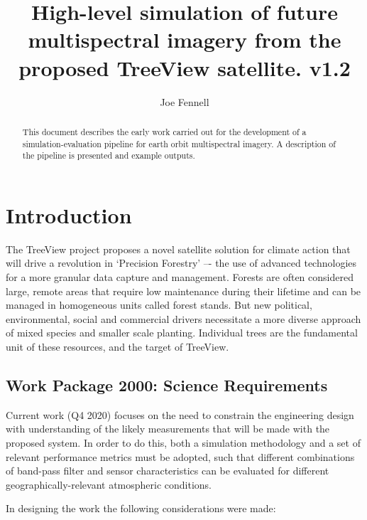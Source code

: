 \documentclass[10pt,a4paper,final,twocolumn]{article}
\author{Joe Fennell}
\title{High-level simulation of future multispectral imagery from the proposed TreeView satellite. v1.2}
\begin{document}
\maketitle
\begin{abstract}
This document describes the early work carried out for the development of a simulation-evaluation pipeline for earth orbit multispectral imagery. A description of the pipeline is presented and example outputs.
\end{abstract}
\section{Introduction}
The TreeView project proposes a novel satellite solution for climate action that will drive a revolution in ‘Precision Forestry’ –- the use of advanced technologies for a more granular data capture and management. Forests are often considered large, remote areas that require low maintenance during their lifetime and can be managed in homogeneous units called forest stands. But new political, environmental, social and commercial drivers necessitate a more diverse approach of mixed species and smaller scale planting. Individual trees are the fundamental unit of these resources, and the target of TreeView. 

\subsection{Work Package 2000: Science Requirements}
Current work (Q4 2020) focuses on the need to constrain the engineering design with understanding of the likely measurements that will be made with the proposed system. In order to do this, both a simulation methodology and a set of relevant performance metrics must be adopted, such that different combinations of band-pass filter and sensor characteristics can be evaluated for different geographically-relevant atmospheric conditions.

In designing the work the following considerations were made:
\end{document}
